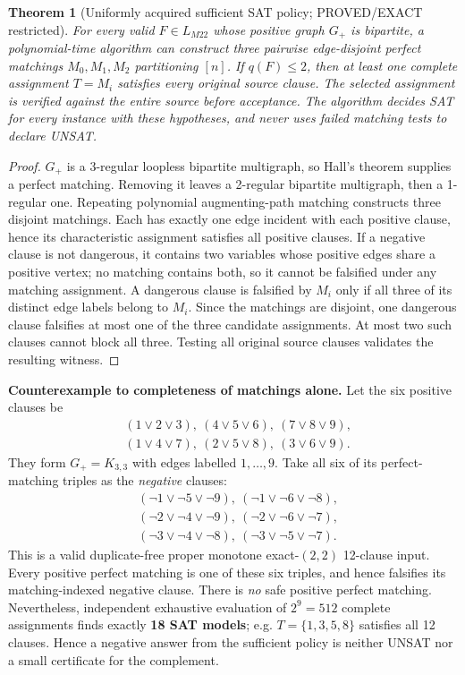 \documentclass[11pt]{article}
\newtheorem{theorem}{Theorem}\newtheorem{lemma}[theorem]{Lemma}
\begin{document}
\begin{theorem}[Uniformly acquired sufficient SAT policy; PROVED/EXACT restricted]\label{three}
For every valid $F\in L_{M22}$ whose positive graph $G_+$ is bipartite, a polynomial-time algorithm can construct three pairwise edge-disjoint perfect matchings $M_0,M_1,M_2$ partitioning $[n]$. If $q(F)\le2$, then at least one complete assignment $T=M_i$ satisfies \emph{every} original source clause. The selected assignment is verified against the entire source before acceptance. The algorithm decides SAT for every instance with these hypotheses, and \emph{never} uses failed matching tests to declare UNSAT.
\end{theorem}
\begin{proof}
$G_+$ is a 3-regular loopless bipartite multigraph, so Hall's theorem supplies a perfect matching. Removing it leaves a 2-regular bipartite multigraph, then a 1-regular one. Repeating polynomial augmenting-path matching constructs three disjoint matchings. Each has exactly one edge incident with each positive clause, hence its characteristic assignment satisfies all positive clauses. If a negative clause is not dangerous, it contains two variables whose positive edges share a positive vertex; no matching contains both, so it cannot be falsified under any matching assignment. A dangerous clause is falsified by $M_i$ only if all three of its distinct edge labels belong to $M_i$. Since the matchings are disjoint, one dangerous clause falsifies at most one of the three candidate assignments. At most two such clauses cannot block all three. Testing all original source clauses validates the resulting witness.\end{proof}

\noindent\textbf{Counterexample to completeness of matchings alone.} Let the six positive clauses be
\[
\begin{split}
& (1\vee2\vee3),\ (4\vee5\vee6),\ (7\vee8\vee9),\\
& (1\vee4\vee7),\ (2\vee5\vee8),\ (3\vee6\vee9).
\end{split}
\]
They form $G_+=K_{3,3}$ with edges labelled $1,\dots,9$. Take all six of its perfect-matching triples as the \emph{negative} clauses:
\[
\begin{split}
&(\neg1\vee\neg5\vee\neg9),\ (\neg1\vee\neg6\vee\neg8),\\
&(\neg2\vee\neg4\vee\neg9),\ (\neg2\vee\neg6\vee\neg7),\\
&(\neg3\vee\neg4\vee\neg8),\ (\neg3\vee\neg5\vee\neg7).
\end{split}
\]
This is a valid duplicate-free proper monotone exact-$(2,2)$ 12-clause input. Every positive perfect matching is one of these six triples, and hence falsifies its matching-indexed negative clause. There is \emph{no} safe positive perfect matching. Nevertheless, independent exhaustive evaluation of $2^9=512$ complete assignments finds exactly \textbf{18 SAT models}; e.g. $T=\{1,3,5,8\}$ satisfies all 12 clauses. Hence a negative answer from the sufficient policy is neither UNSAT nor a small certificate for the complement.
\end{document}
